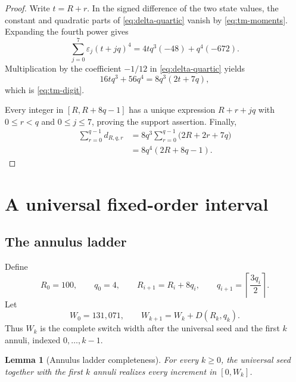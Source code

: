 \documentclass[11pt]{article}
\newtheorem{lemma}[theorem]{Lemma}
\theoremstyle{definition}
\theoremstyle{remark}
\begin{document}
\begin{proof}
Write $t=R+r$.  In the signed difference of the two state values, the constant
and quadratic parts of \eqref{eq:delta-quartic} vanish by
\eqref{eq:tm-moments}.  Expanding the fourth power gives
\[
  \sum_{j=0}^{7}\varepsilon_j(t+jq)^4
  =4tq^3(-48)+q^4(-672).
\]
Multiplication by the coefficient $-1/12$ in
\eqref{eq:delta-quartic} yields
\[
  16tq^3+56q^4=8q^3(2t+7q),
\]
which is \eqref{eq:tm-digit}.

Every integer in $[R,R+8q-1]$ has a unique expression $R+r+jq$ with
$0\le r<q$ and $0\le j\le7$, proving the support assertion.  Finally,
\begin{align*}
  \sum_{r=0}^{q-1}d_{R,q,r}
  &=8q^3\sum_{r=0}^{q-1}\bigl(2R+2r+7q\bigr)\\
  &=8q^4(2R+8q-1).
\end{align*}
\end{proof}

\section{A universal fixed-order interval}

\subsection{The annulus ladder}

Define
\begin{equation}\label{eq:ladder}
  R_0=100,
  \qquad q_0=4,
  \qquad
  R_{i+1}=R_i+8q_i,
  \qquad
  q_{i+1}=\left\lceil\frac{3q_i}{2}\right\rceil.
\end{equation}
Let
\begin{equation}\label{eq:Wk}
  W_0=131{,}071,
  \qquad
  W_{k+1}=W_k+D(R_k,q_k).
\end{equation}
Thus $W_k$ is the complete switch width after the universal seed and the first
$k$ annuli, indexed $0,\ldots,k-1$.

\begin{lemma}[Annulus ladder completeness]\label{lem:annulus-complete}
For every $k\ge0$, the universal seed together with the first $k$ annuli
realizes every increment in $[0,W_k]$.
\end{lemma}
\end{document}
